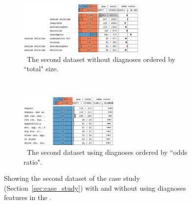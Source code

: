 \begin{figure}
\centering
\begin{subfigure}[b]{0.75\linewidth}
    \hfill
    \includegraphics[height=7em]{explainer/adm_10_size}
    \caption{~The second dataset without diagnoses ordered by ``total" size.}
    \label{figs:adm_10_size}
\end{subfigure}
\\
\begin{subfigure}[b]{0.75\linewidth}
    \hfill
    \includegraphics[height=7em]{explainer/adm_10_or_full}
    \caption{~The second dataset using diagnoses ordered by ``odds ratio".}
    \label{figs:adm_10_diag}
\end{subfigure}%
\caption{Showing the second dataset of the case study (Section~\ref{sec:case_study}) with and without using diagnoses features in the \textbf{\tabB}.}
\end{figure}
